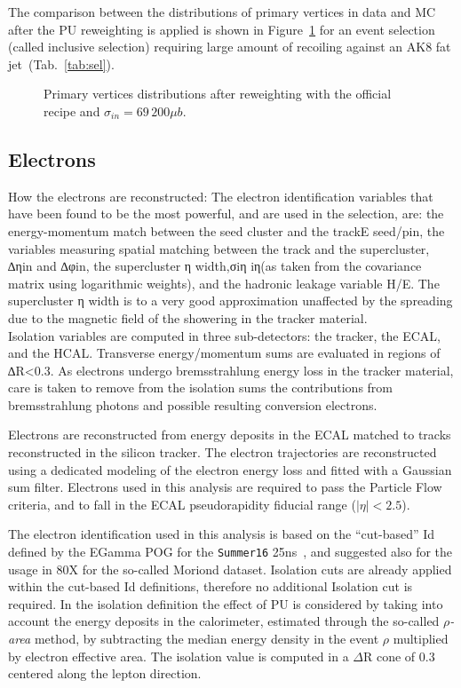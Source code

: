 The comparison between the distributions of primary vertices in data and MC after the PU reweighting is applied is shown in Figure~\ref{fig:npv} for an event selection (called inclusive selection) requiring large amount of \met recoiling against an AK8 fat jet~(Tab.~\ref{tab:sel}).
 
 \begin{figure}[!htb]
  \centering
  \caption{Primary vertices distributions after reweighting with the official recipe and $\sigma_{in}=69\,200 \mu b$.}
  \label{fig:npv}
 \end{figure}


\subsection{Electrons}\label{ssec:electrons}
{\color{red} How the electrons are reconstructed: The electron identification variables that have been found to be the most powerful, and are
used in the selection, are: the energy-momentum match between the seed cluster and the trackE seed/pin, the variables measuring spatial matching between the track and the supercluster, ∆ηin and ∆φin, the supercluster η width,σiη iη(as taken from the covariance matrix using logarithmic weights), and the hadronic leakage variable H/E. The supercluster η width is to a very good approximation unaffected by the spreading due to the magnetic field of the showering in
the tracker material.\\ Isolation variables are computed in three sub-detectors: the tracker, the ECAL, and the HCAL. Transverse energy/momentum sums are evaluated in regions of ∆R<0.3. As electrons undergo bremsstrahlung energy loss in the tracker material, care is taken to remove from the isolation sums the contributions from bremsstrahlung photons and possible resulting conversion electrons.}

Electrons are reconstructed from energy deposits in the ECAL matched to tracks reconstructed in the silicon tracker. 
The electron trajectories are reconstructed using a dedicated modeling of the electron energy loss and fitted with a Gaussian sum filter.
Electrons used in this analysis are required to pass the Particle Flow criteria, and to fall in the ECAL pseudorapidity fiducial range ($|\eta|<2.5$). 

The electron identification used in this analysis is based on the ``cut-based'' Id defined by the EGamma POG for the \texttt{Summer16} 25ns~\cite{EGammaPOG_ele}, and suggested also for the usage in 80X for the so-called Moriond dataset.
Isolation cuts are already applied within the cut-based Id definitions, therefore no additional Isolation cut is required.
In the isolation definition the effect of PU is considered by taking into account the energy deposits in the calorimeter, estimated through the so-called \emph{$\rho$-area} method, by subtracting the median energy density in the event $\rho$ multiplied by electron effective area.
The isolation value is computed in a $\Delta$R cone of 0.3 centered along the lepton direction.

